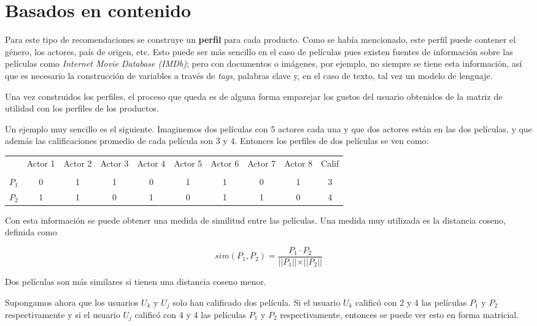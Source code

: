 \section{Basados en contenido}

Para este tipo de recomendaciones se construye un \textbf{perfil} para cada producto. Como se había mencionado, este perfil puede contener el género, los actores, país de origen, etc. Esto puede ser más sencillo en el caso de películas pues existen fuentes de información sobre las películas como \textit{Internet Movie Database (IMDb)}; pero con documentos o imágenes, por ejemplo, no siempre se tiene esta información, así que es necesario la construcción de variables a través de \textit{tags}, palabras clave y, en el caso de texto, tal vez un modelo de lenguaje.

Una vez construidos los perfiles, el proceso que queda es de alguna forma emparejar los gustos del usuario obtenidos de la matriz de utilidad con los perfiles de los productos.

Un ejemplo muy sencillo es el siguiente. Imaginemos dos películas con 5 actores cada una y que dos actores están en las dos películas, y que además las calificaciones promedio de cada película son 3 y 4. Entonces los perfiles de dos películas se ven     como:

\begin{center}
\begin{tabular}{ c | c  c c c c c c c c}
    & Actor 1 & Actor 2 & Actor 3 & Actor 4 & Actor 5 & Actor 6 & Actor 7 & Actor 8 & Calif \\ \\
  \hline                       
$P_1$ & 0 & 1 & 1 & 0 & 1 & 1 & 0 & 1 & 3 \\
$P_2$ & 1 & 1 & 0 & 1 & 0 & 1 & 1 & 0 & 4 \\
  \hline  
\end{tabular}
\end{center}

Con esta información se puede obtener una medida de similitud entre las películas. Una medida muy utilizada es la distancia coseno, definida como

\begin{equation}
sim(P_1, P_2) = \dfrac{P_1 \cdot P_2}{\vert \vert P_1 \vert \vert \times \vert \vert P_2 \vert \vert}
\end{equation}

Dos películas son más similares si tienen una distancia coseno menor.

Supongamos ahora que los usuarios $U_k$ y $U_j$ solo han calificado dos película. Si el usuario $U_k$ calificó con 2 y 4 las películas $P_1$ y $P_2$ respectivamente y si el usuario $U_j$ calificó con 4 y 4 las películas $P_1$ y $P_2$ respectivamente, entonces se puede ver esto en forma matricial.


